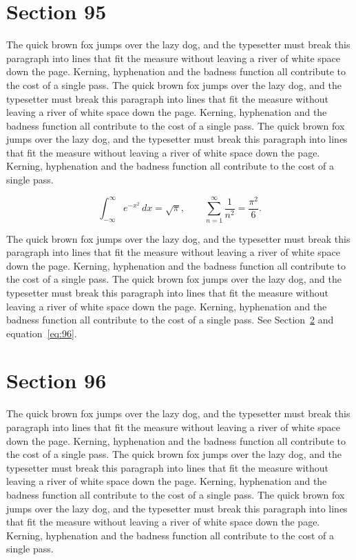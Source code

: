 \documentclass{article}
\begin{document}
\section{Section 95}
\label{sec:95}
The quick brown fox jumps over the lazy dog, and the typesetter must break this paragraph into lines that fit the measure without leaving a river of white space down the page. Kerning, hyphenation and the badness function all contribute to the cost of a single pass. The quick brown fox jumps over the lazy dog, and the typesetter must break this paragraph into lines that fit the measure without leaving a river of white space down the page. Kerning, hyphenation and the badness function all contribute to the cost of a single pass. The quick brown fox jumps over the lazy dog, and the typesetter must break this paragraph into lines that fit the measure without leaving a river of white space down the page. Kerning, hyphenation and the badness function all contribute to the cost of a single pass. 

\begin{equation}\label{eq:95}
\int_{-\infty}^{\infty} e^{-x^{2}}\,dx = \sqrt{\pi}, \qquad
\sum_{n=1}^{\infty} \frac{1}{n^{2}} = \frac{\pi^{2}}{6}.
\end{equation}

The quick brown fox jumps over the lazy dog, and the typesetter must break this paragraph into lines that fit the measure without leaving a river of white space down the page. Kerning, hyphenation and the badness function all contribute to the cost of a single pass. The quick brown fox jumps over the lazy dog, and the typesetter must break this paragraph into lines that fit the measure without leaving a river of white space down the page. Kerning, hyphenation and the badness function all contribute to the cost of a single pass. 
See Section~\ref{sec:96} and equation~\eqref{eq:96}.
\section{Section 96}
\label{sec:96}
The quick brown fox jumps over the lazy dog, and the typesetter must break this paragraph into lines that fit the measure without leaving a river of white space down the page. Kerning, hyphenation and the badness function all contribute to the cost of a single pass. The quick brown fox jumps over the lazy dog, and the typesetter must break this paragraph into lines that fit the measure without leaving a river of white space down the page. Kerning, hyphenation and the badness function all contribute to the cost of a single pass. The quick brown fox jumps over the lazy dog, and the typesetter must break this paragraph into lines that fit the measure without leaving a river of white space down the page. Kerning, hyphenation and the badness function all contribute to the cost of a single pass. 
\end{document}
